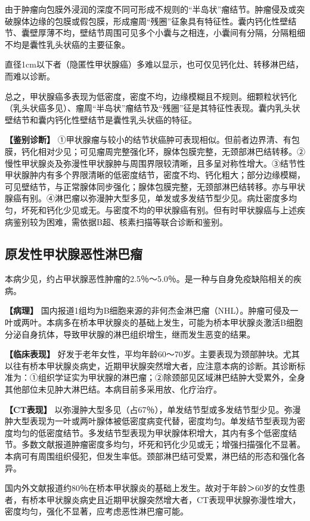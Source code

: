 由于肿瘤向包膜外浸润的深度不同可形成不规则的“半岛状”瘤结节。肿瘤侵及或突破腺体边缘的包膜或假包膜，形成瘤周“残圈”征象具有特征性。囊内钙化性壁结节、囊壁厚薄不均，壁结节周围可见多个小囊与之相连，小囊间有分隔，分隔粗细不均是囊性乳头状癌的主要征象。

直径1cm以下者（隐匿性甲状腺癌）多难以显示，也可仅见钙化灶、转移淋巴结，而难以诊断。

总之，甲状腺癌多表现为低密度，密度不均，边缘模糊且不规则。细颗粒状钙化（乳头状癌多见）、瘤周“半岛状”瘤结节及“残圈”征是其特征性表现。囊内乳头状壁结节和囊内钙化性壁结节是囊性乳头状癌的特征。

\textbf{【鉴别诊断】}
①甲状腺瘤与较小的结节状癌肿可表现相似。但前者边界清、有包膜，钙化相对少见；可见瘤周完整强化环，腺体包膜完整，无颈部淋巴结转移。②慢性甲状腺炎及弥漫性甲状腺肿与周围界限较清晰，且多呈对称性增大。③结节性甲状腺肿内有多个界限清晰的低密度结节，密度不均、钙化粗大；部分边缘模糊，可见壁结节，与正常腺体同步强化；腺体包膜完整，无颈部淋巴结转移。亦与甲状腺癌有别。④淋巴瘤以弥漫肿大型多见，单发或多发结节型少见。病灶密度多均匀，坏死和钙化少见或无。与密度不均的甲状腺癌有别。但有时甲状腺癌与上述疾病鉴别较为困难，需依据B超、核素扫描等联合诊断和鉴别。

\subsection{原发性甲状腺恶性淋巴瘤}

本病少见，约占甲状腺恶性肿瘤的2.5％～5.0％。是一种与自身免疫缺陷相关的疾病。

\textbf{【病理】}
国内报道1组均为B细胞来源的非何杰金淋巴瘤（NHL）。肿瘤可侵及一叶或两叶。本病多在桥本甲状腺炎的基础上发生，可能为桥本甲状腺炎激活B细胞分泌自身抗体，导致甲状腺的淋巴组织增生，继而发生恶变的结果。

\textbf{【临床表现】}
好发于老年女性，平均年龄60～70岁。主要表现为颈部肿块。尤其以往有桥本甲状腺炎病史，近期甲状腺突然增大者，应注意本病的诊断。其诊断标准为：①组织学证实为甲状腺的淋巴瘤；②除颈部见区域淋巴结肿大受累外，全身其他部位未见肿大淋巴结。本病目前多采用放、化疗治疗。

\textbf{【CT表现】}
以弥漫肿大型多见（占67％），单发结节型或多发结节型少见。弥漫肿大型表现为一叶或两叶腺体被低密度病变代替，密度均匀。单发结节型表现为密度均匀的低密度结节。多发结节型表现为甲状腺体积增大，其内有多个低密度结节。多数文献报道肿瘤密度多均匀，坏死和钙化少见或无；增强扫描强化不显著。本病可有周围组织侵犯，但发生率低。颈部淋巴结可受累，淋巴结的形态和强化各异。

国内外文献报道约80％在桥本甲状腺炎的基础上发生。故对于年龄＞60岁的女性患者，有桥本甲状腺炎病史且近期甲状腺突然增大者，CT表现甲状腺弥漫性增大，密度均匀，强化不显著，应考虑恶性淋巴瘤可能。

